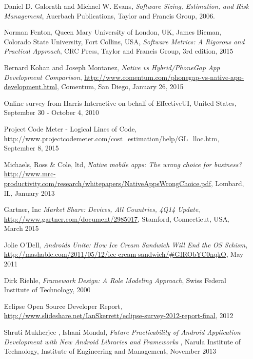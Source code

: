 \begin{thebibliography}{9}

Daniel D. Galorath and Michael W. Evans, \emph{Software Sizing, Estimation, and Risk Management}, Auerbach Publications, Taylor and Francis Group, 2006.
  
Norman Fenton, Queen Mary University of London, UK, James Bieman, Colorado State University, Fort Collins, USA, \emph{Software Metrics: A Rigorous and Practical Approach}, CRC Press, Taylor and Francis Group, 3rd edition, 2015
  
Bernard Kohan and Joseph Montanez,
\emph{Native vs Hybrid/PhoneGap App Development Comparison},
  \url{http://www.comentum.com/phonegap-vs-native-app-development.html},
  Comentum, San Diego,
  January 26, 2015
  
	Online survey from Harris Interactive on behalf of EffectiveUI,
	United States,
September 30 - October 4, 2010

	Project Code Meter - Logical Lines of Code,
	\url{http://www.projectcodemeter.com/cost_estimation/help/GL_lloc.htm},
September 8, 2015

	Michaels, Ross \& Cole, ltd,
	\emph{Native mobile apps: The wrong choice for business?}
	\url{http://www.mrc-productivity.com/research/whitepapers/NativeAppsWrongChoice.pdf},
	Lombard, IL,
January 2013

	Gartner, Inc
	\emph{Market Share: Devices, All Countries, 4Q14 Update},
	\url{ http://www.gartner.com/document/2985017},
	Stamford, Connecticut, USA,
March 2015

	Jolie O'Dell, 
	\emph{Androids Unite: How Ice Cream Sandwich Will End the OS Schism},
	\url{ http://mashable.com/2011/05/12/ice-cream-sandwich/#GIRObYC0nqkO},
	May 2011

	Dirk Riehle, 
	\emph{Framework Design: A Role Modeling Approach},
	Swiss Federal Institute of Technology,
	2000
	
	Eclipse Open Source Developer Report, 
	\url{http://www.slideshare.net/IanSkerrett/eclipse-survey-2012-report-final},
	2012
	
	Shruti Mukherjee , Ishani Mondal, 
	\emph{Future Practicability of Android Application Development with New Android Libraries and Frameworks },
	Narula Institute of Technology, 
	Institute of Engineering and Management,
	November 2013 
	

\end{thebibliography}
